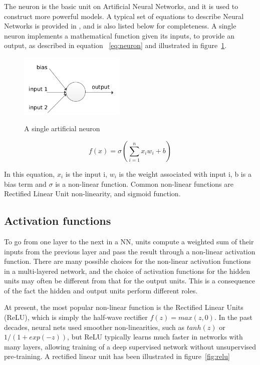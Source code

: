The neuron is the basic unit on Artificial Neural Networks, and it is used to construct more powerful models. A typical set of equations to describe Neural Networks is provided in \cite{williams1986learning}, and is also listed below for completeness. A single neuron implements a mathematical function given its inputs, to provide an output, as described in equation ~\ref{eq:neuron} and illustrated in figure~\ref{fig:neuron}.

\begin{figure}[H]
	\centering
	{\includegraphics[width=0.45\textwidth]{images/neuron}}
	\caption{A single artificial neuron}
	\label{fig:neuron}
\end{figure}

\begin{equation}
f(x) = \sigma(\sum\limits_{i=1}^{n}x_iw_i + b) 
\label{eq:neuron}
\end{equation}

In this equation, $x_i$ is the input i, $w_i$ is the weight associated with input i, b is a bias term and $\sigma$ is a non-linear function. Common non-linear functions are Rectified Linear Unit non-linearity, and sigmoid function.

\subsection{Activation functions}
\label{sec:actfun}
To go from one layer to the next in a NN, units compute a weighted sum of their inputs from the previous layer and pass the result through a non-linear activation function\cite{lecun2015deep}. There are many possible choices for the non-linear activation functions in a multi-layered network, and the choice of activation functions for the hidden units may often be different from that for the output units. This is a consequence of the fact the hidden and output units perform different roles\cite{bishop1995neural}. 

\indent At present, the most popular non-linear function is the Rectified Linear Units (ReLU), which is simply the half-wave rectifier $f(z) = max(z, 0)$. In the past decades, neural nets used smoother non-linearities, such as $tanh(z)$ or $1/(1+ exp(-z))$, but ReLU typically learns much faster in networks with many layers, allowing training of a deep supervised network without unsupervised pre-training\cite{lecun2015deep}. A rectified linear unit has been illustrated in figure~\ref{fig:relu}

